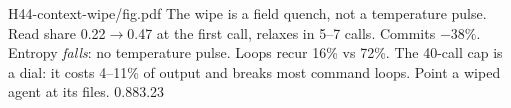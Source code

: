 {H44-context-wipe/fig.pdf}
{The wipe is a field quench, not a temperature pulse.}
{Read share 0.22$\to$0.47 at the first call, relaxes in 5--7 calls. Commits $-38\%$. Entropy \emph{falls}: no temperature pulse. Loops recur 16\% vs 72\%.}
{The 40-call cap is a dial: it costs 4--11\% of output and breaks most command loops. Point a wiped agent at its files.}
{0.88}{3.23}
